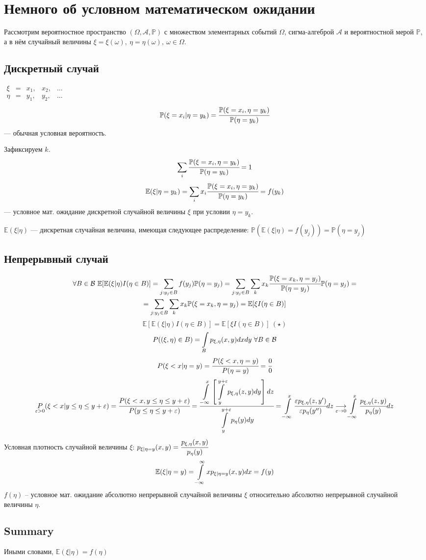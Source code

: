 \documentclass{report}
\renewcommand{\int}{\displaystyle\intop}
\renewcommand{\P}{\mathbb{P}}
\newcommand{\E}{\mathbb{E}}
\begin{document}
\section*{Немного об условном математическом ожидании}
Рассмотрим вероятностное пространство $(\Omega,\mathcal{A},\P)$ с множеством элементарных событий $\Omega$, сигма-алгеброй $\mathcal{A}$ и вероятностной мерой $\mathbb{P}$, а в нём случайный величины $\xi=\xi(\omega),\ \eta=\eta(\omega),\ \omega\in\Omega$.
\subsection*{Дискретный случай}
$\begin{matrix}
\xi&= & x_1, & x_2, & \ldots \\
\eta&= & y_1, & y_2, & \ldots
\end{matrix}$
$$\P(\xi=x_i|\eta=y_k)=\cfrac{\P(\xi=x_i,\eta=y_k)}{\P(\eta=y_k)}$$ --- обычная условная вероятность.

Зафиксируем $k$.
$$\sum_i\cfrac{\P(\xi=x_i,\eta=y_k)}{\P(\eta=y_k)}=1$$
$$\E(\xi|\eta=y_k)=\sum_ix_i\cfrac{\P(\xi=x_i,\eta=y_k)}{\P(\eta=y_k)}=f(y_k)$$ --- условное мат. ожидание дискретной случайной величины $\xi$ при условии $\eta=y_k$.

$\E(\xi|\eta)$ --- дискретная случайная величина, имеющая следующее распределение:
$\P(\E(\xi|\eta)=f(y_j))=\P(\eta=y_j)$

\subsection*{Непрерывный случай}
\begin{multline*}
\forall B\in\mathcal{B}\ \E[\E(\xi|\eta)I(\eta\in B)]=\sum_{j:y_j\in B}f(y_j)\P(\eta=y_j)=\sum_{j:y_j\in B}\sum_kx_k\cfrac{\P(\xi=x_k,\eta=y_j)}{\P(\eta=y_j)}\P(\eta=y_j)=\\
=\sum_{j:y_j\in B}\sum_kx_k\P(\xi=x_k,\eta=y_j)=\E[\xi I(\eta\in B)]
\end{multline*}
$$
\E[\E(\xi|\eta)I(\eta\in B)]=\E[\xi I(\eta\in B)]\ (\star)
$$
$$
P((\xi,\eta)\in B)=\int_Bp_{\xi,\eta}(x,y)dxdy\ \forall B\in\mathcal{B}
$$
$$
P(\xi<x|\eta=y)=\cfrac{P(\xi<x,\eta=y)}{P(\eta=y)}=\cfrac00
$$
$$
\underset{\varepsilon>0}{P}(\xi<x|y\leq\eta\leq y+\varepsilon)=
\cfrac{P(\xi<x,y\leq\eta\leq y+\varepsilon)}{P(y\leq\eta\leq y+\varepsilon)}=
\cfrac{\int_{-\infty}^x\left[\int_y^{y+\varepsilon}p_{\xi,\eta}(z,y)dy\right]dz}{\int_y^{y+\varepsilon}p_\eta(y)dy}=
\int_{-\infty}^x\cfrac{\varepsilon p_{\xi,\eta}(z,y')}{\varepsilon p_{\eta}(y'')}dz\underset{\varepsilon\to0}{\longrightarrow}\int_{-\infty}^x\cfrac{p_{\xi,\eta}(z,y)}{p_\eta(y)}dz
$$
Условная плотность случайной величины $\xi$: $p_{\xi|\eta=y}(x,y)=\cfrac{p_{\xi,\eta}(x,y)}{p_\eta(y)}$
$$
\E(\xi|\eta=y)=\int_{-\infty}^{\infty}xp_{\xi|\eta=y}(x,y)dx=f(y)
$$
$f(\eta)$ -- условное мат. ожидание абсолютно непрерывной случайной величины $\xi$ относительно абсолютно непрерывной случайной величины $\eta$.
\subsection*{Summary}
Иными словами, $\E(\xi|\eta)=f(\eta)$
\end{document}
